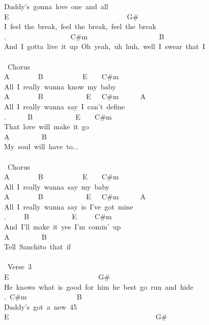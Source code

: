 {Daddy's\ gonna\ love\ one\ and\ all\\
E\ \ \ \ \ \ \ \ \ \ \ \ \ \ \ \ \ \ \ \ \ \ \ \ \ \ \ \ \ \ \ \ \ G\#\\
I\ feel\ the\ break,\ feel\ the\ break,\ feel\ the\ break\\
.\ \ \ \ \ \ \ \ \ \ \ \ \ \ \ \ \ \ C\#m\ \ \ \ \ \ \ \ \ \ \ \ \ \ \ \ \ \ \ \ B\ \\
And\ I\ gotta\ live\ it\ up\ Oh\ yeah,\ uh\ huh,\ well\ I\ swear\ that\ I\\
\\
\lbrack\ Chorus\rbrack\\
A\ \ \ \ \ \ \ \ B\ \ \ \ \ \ \ \ \ \ \ E\ \ \ \ C\#m\\
All\ I\ really\ wanna\ know\ my\ baby\\
A\ \ \ \ \ \ \ \ B\ \ \ \ \ \ \ \ \ \ \ \ E\ \ \ C\#m\ \ \ \ \ \ A\\
All\ I\ really\ wanna\ say\ I\ can't\ define\\
.\ \ \ \ \ \ B\ \ \ \ \ \ \ \ \ \ \ \ E\ \ \ \ C\#m\\
That\ love\ will\ make\ it\ go\\
A\ \ \ \ \ \ \ \ \ B\\
My\ soul\ will\ have\ to...\\
\\
\lbrack\ Chorus\rbrack\\
A\ \ \ \ \ \ \ \ B\ \ \ \ \ \ \ \ \ \ \ E\ \ \ \ C\#m\\
All\ I\ really\ wanna\ say\ my\ baby\\
A\ \ \ \ \ \ \ \ B\ \ \ \ \ \ \ \ \ \ \ \ E\ \ \ C\#m\ \ \ \ \ \ A\\
All\ I\ really\ wanna\ say\ is\ I've\ got\ mine\\
.\ \ \ \ \ B\ \ \ \ \ \ \ \ \ \ \ \ E\ \ \ \ \ C\#m\\
And\ I'll\ make\ it\ yes\ I'm\ comin'\ up\\
A\ \ \ \ \ \ \ \ \ B\\
Tell\ Sanchito\ that\ if\\
\\
\lbrack\ Verse\ 3\rbrack\\
E\ \ \ \ \ \ \ \ \ \ \ \ \ \ \ \ \ \ \ \ \ \ \ \ \ G\#\\
He\ knows\ what\ is\ good\ for\ him\ he\ best\ go\ run\ and\ hide\\
.\ C\#m\ \ \ \ \ \ \ \ \ \ \ \ \ \ B\\
Daddy's\ got\ a\ new\ 45\\
E\ \ \ \ \ \ \ \ \ \ \ \ \ \ \ \ \ \ \ \ \ \ \ \ \ \ \ \ \ \ \ \ \ \ \ \ \ \ \ \ \ G\#\\
}
